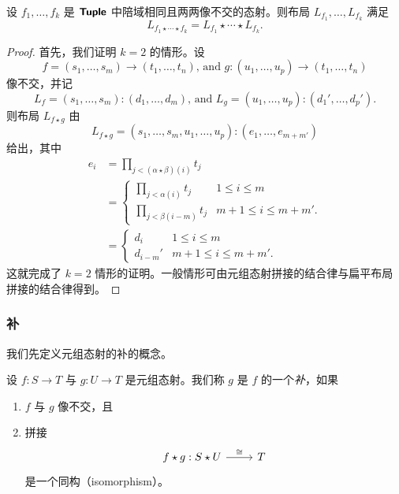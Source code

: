 \begin{proposition}\label{concatenateinCproposition}
    设 $f_1,\dots,f_k$ 是 ${\boldsymbol{\mathsf{Tuple}}}$ 中陪域相同且两两像不交的态射。则布局 $L_{f_1},\dots,L_{f_k}$ 满足 
    \[
    L_{f_1 \star \cdots \star  f_k} = 
    L_{f_1} \star \cdots \star  L_{f_k}.
    \]
\end{proposition}
\begin{proof}
    首先，我们证明 $k = 2$ 的情形。设
    \[f = (s_1,\dots,s_m) \to (t_1,\dots,t_n)\text{, and } g:(u_1,\dots,u_p) \to (t_1,\dots,t_n)\]
    像不交，并记
    \[L_f = (s_1,\dots,s_m):(d_1,\dots,d_m)\text{, and }L_g = (u_1,\dots, u_p) :(d_1',\dots,d_{p}').\]
    则布局 $L_{f \star g}$ 由
    \[
    L_{f \star g} = (s_1,\dots,s_m,u_1,\dots,u_p): (e_1,\dots,e_{m+m'})
    \] 
    给出，其中
    \begin{align*}
    e_i & = \prod_{j< (\alpha \star \beta)(i)} t_j \\
    & = \begin{cases}
        \displaystyle\prod_{j<\alpha(i)}t_j & 1 \leq i \leq m\\
        \displaystyle\prod_{j<\beta(i-m)} t_j & m+1 \leq i \leq m+m'.
    \end{cases}\\
    & = \begin{cases}
        d_i & 1 \leq i \leq m\\
        d_{i-m}' & m+1 \leq i \leq m+m'.
    \end{cases}
    \end{align*}
    这就完成了 $k = 2$ 情形的证明。一般情形可由元组态射拼接的结合律与扁平布局拼接的结合律得到。
\end{proof}

\subsubsection{补}
\label{subsubsection.complement}

我们先定义元组态射的补的概念。

\begin{definition}\label{definitionofcomplementarymorphismsinC} 设 $f:S \to T$ 与 $g:U \to T$ 是元组态射。我们称 $g$ 是 $f$ 的一个{\it 补}，如果 
\begin{enumerate} 
\item $f$ 与 $g$ 像不交，且 
\item 拼接
\[ \begin{tikzcd} f \star g:S \star U \ar[r,"\cong"] &  T \end{tikzcd} \] 是一个同构（isomorphism）。
\end{enumerate}
\end{definition}

